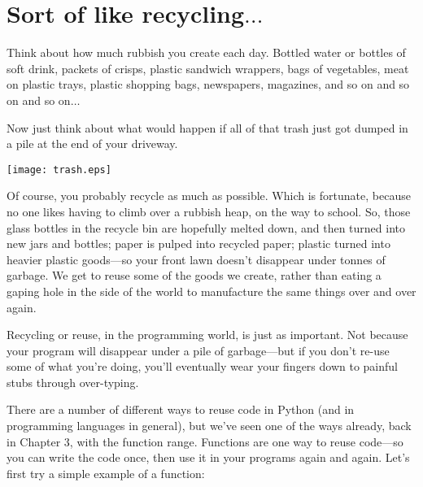 

\chapter{Sort of like recycling$\ldots$}\label{ch:sortoflikerecycling}

Think about how much rubbish you create each day. Bottled water or bottles of soft drink, packets of crisps, plastic sandwich wrappers, bags of vegetables, meat on plastic trays, plastic shopping bags, newspapers, magazines, and so on and so on and so on$\ldots$
\par
Now just think about what would happen if all of that trash just got dumped in a pile at the end of your driveway.

\begin{center}
\texttt{[image: trash.eps]}
\end{center}

Of course, you probably recycle as much as possible.  Which is fortunate, because no one likes having to climb over a rubbish heap, on the way to school.  So, those glass bottles in the recycle bin are hopefully melted down, and then turned into new jars and bottles; paper is pulped into recycled paper; plastic turned into heavier plastic goods---so your front lawn doesn't disappear under tonnes of garbage. We get to reuse some of the goods we create, rather than eating a gaping hole in the side of the world to manufacture the same things over and over again.

Recycling or reuse, in the programming world, is just as important. Not because your program will disappear under a pile of garbage---but if you don't re-use some of what you're doing, you'll eventually wear your fingers down to painful stubs through over-typing.

There are a number of different ways to reuse code in Python (and in programming languages in general), but we've seen one of the ways already, back in Chapter 3, with the function range.  Functions are one way to reuse code---so you can write the code once, then use it in your programs again and again.  Let's first try a simple example of a function:

